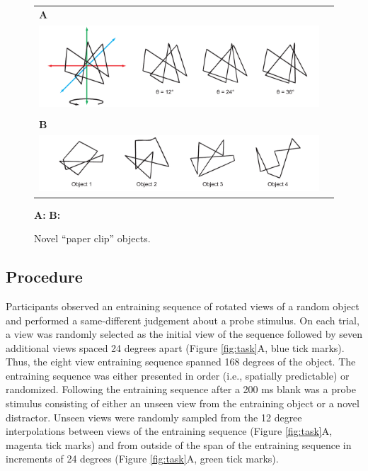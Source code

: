 \documentclass[dwyatte_dissertation.tex]{subfiles}
\begin{document}
\begin{figure}[h!]
\centering
\begin{tabular}{ll}
\textbf{A} \\
\includegraphics[width=160mm]{figs/pleast/paperclip_rots.pdf} \\
\vspace{5mm} \\
\textbf{B} \\
\includegraphics[width=160mm]{figs/pleast/paperclip_objs.pdf} \\
\end{tabular}
\caption{Novel ``paper clip'' objects.}{\textbf{A:} \textbf{B:}}
\label{fig:paperclip}
\end{figure}

\subsection{Procedure}
Participants observed an entraining sequence of rotated views of a random object and performed a same-different judgement about a probe stimulus. On each trial, a view was randomly selected as the initial view of the sequence followed by seven additional views spaced 24 degrees apart (Figure \ref{fig:task}A, blue tick marks). Thus, the eight view entraining sequence spanned 168 degrees of the object. The entraining sequence was either presented in order (i.e., spatially predictable) or randomized. Following the entraining sequence after a 200 ms blank was a probe stimulus consisting of either an unseen view from the entraining object or a novel distractor. Unseen views were randomly sampled from the 12 degree interpolations between views of the entraining sequence (Figure \ref{fig:task}A, magenta tick marks) and from outside of the span of the entraining sequence in increments of 24 degrees (Figure \ref{fig:task}A, green tick marks).
\end{document}
